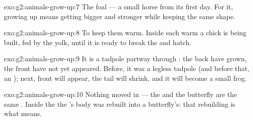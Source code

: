 \begin{solution}{exo:g2:animals-grow-up:7}
The foal --- a small horse from its first day. For it, growing up
means getting bigger and stronger while keeping the same shape.
\end{solution}

\begin{solution}{exo:g2:animals-grow-up:8}
To keep them warm. Inside each warm  a chick is being built,
fed by the yolk, until it is ready to break the  and hatch.
\end{solution}

\begin{solution}{exo:g2:animals-grow-up:9}
It is a tadpole partway through : the back  have
grown, the front  have not yet appeared. Before, it was a
legless tadpole (and before that, an ); next, front  will
appear, the tail will shrink, and it will become a small frog.
\end{solution}

\begin{solution}{exo:g2:animals-grow-up:10}
Nothing moved in --- the  and the butterfly are the
same . Inside the  the 's body was
rebuilt into a butterfly's: that rebuilding is what 
means.
\end{solution}
